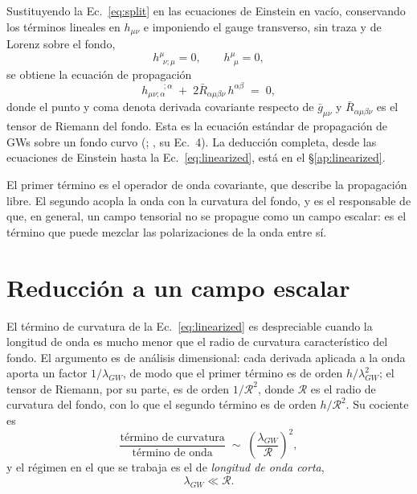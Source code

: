 \documentclass[11pt,a4paper,openany]{book}
\begin{document}
Sustituyendo la Ec.~\eqref{eq:split} en las ecuaciones de Einstein en vac\'io,
conservando los t\'erminos lineales en $h_{\mu\nu}$ e imponiendo el gauge
transverso, sin traza y de Lorenz sobre el fondo,
\begin{equation}
  h^{\mu}_{\ \ \nu;\mu}=0, \qquad h^{\mu}_{\ \ \mu}=0 ,
  \label{eq:gauge}
\end{equation}
se obtiene la ecuaci\'on de propagaci\'on
\begin{equation}
  h_{\mu\nu;\alpha}^{\qquad;\alpha}
  \;+\;2\bar R_{\alpha\mu\beta\nu}\,h^{\alpha\beta}\;=\;0 ,
  \label{eq:linearized}
\end{equation}
donde el punto y coma denota derivada covariante respecto de $\bar g_{\mu\nu}$
y $\bar R_{\alpha\mu\beta\nu}$ es el tensor de Riemann del fondo. Esta es la
ecuaci\'on est\'andar de propagaci\'on de GWs sobre un fondo curvo
(\citealp{Isaacson1968}; \citealp{Takahashi2003}, su Ec.~4). La deducci\'on
completa, desde las ecuaciones de Einstein hasta la Ec.~\eqref{eq:linearized},
est\'a en el \S\ref{ap:linearized}.

El primer t\'ermino es el operador de onda covariante, que describe la
propagaci\'on libre. El segundo acopla la onda con la curvatura del fondo, y
es el responsable de que, en general, un campo tensorial no se propague como
un campo escalar: es el t\'ermino que puede mezclar las polarizaciones de la
onda entre s\'i.

\section{Reducci\'on a un campo escalar}
\label{sec:reduccion}

El t\'ermino de curvatura de la Ec.~\eqref{eq:linearized} es despreciable
cuando la longitud de onda es mucho menor que el radio de curvatura
caracter\'istico del fondo. El argumento es de an\'alisis dimensional: cada
derivada aplicada a la onda aporta un factor $1/\lambda_{GW}$, de modo que el
primer t\'ermino es de orden $h/\lambda_{GW}^{2}$; el tensor de Riemann, por
su parte, es de orden $1/\mathcal{R}^{2}$, donde $\mathcal{R}$ es el radio de
curvatura del fondo, con lo que el segundo t\'ermino es de orden
$h/\mathcal{R}^{2}$. Su cociente es
\begin{equation}
  \frac{\text{t\'ermino de curvatura}}{\text{t\'ermino de onda}}
  \;\sim\;\left(\frac{\lambda_{GW}}{\mathcal{R}}\right)^{2},
  \label{eq:eikonal_ratio}
\end{equation}
y el r\'egimen en el que se trabaja es el de \emph{longitud de onda corta},
\begin{equation}
  \lambda_{GW}\ll\mathcal{R} .
  \label{eq:eikonal}
\end{equation}
\end{document}
